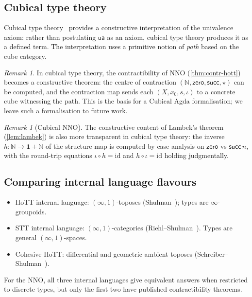 \documentclass[12pt]{article}
\theoremstyle{definition}
\theoremstyle{remark}
\newtheorem{remark}[theorem]{Remark}
\newcommand{\N}{\mathbb{N}}
\newcommand{\id}{\mathrm{id}}
\newcommand{\zero}{\mathsf{zero}}
\newcommand{\suc}{\mathsf{succ}}
\newcommand{\NNO}{\mathrm{NNO}}
\newcommand{\ua}{\mathsf{ua}}
\begin{document}
\subsection{Cubical type theory}

Cubical type theory~\cite{CCHM} provides a constructive interpretation of the univalence axiom: rather than postulating $\ua$ as an axiom, cubical type theory produces it as a defined term. The interpretation uses a primitive notion of \emph{path} based on the cube category.

\begin{remark}
In cubical type theory, the contractibility of $\NNO$ (\cref{thm:contr-hott}) becomes a constructive theorem: the centre of contraction $(\N,\zero,\suc,\star)$ can be computed, and the contraction map sends each $(X,x_{0},s,\iota)$ to a concrete cube witnessing the path. This is the basis for a Cubical Agda formalisation; we leave such a formalisation to future work.
\end{remark}

\begin{remark}[Cubical NNO]
The constructive content of Lambek's theorem (\cref{lem:lambek}) is also more transparent in cubical type theory: the inverse $h\colon \N\to\mathbf{1}+\N$ of the structure map is computed by case analysis on $\zero$ vs $\suc\,n$, with the round-trip equations $\iota\circ h=\id$ and $h\circ\iota=\id$ holding judgmentally.
\end{remark}

\subsection{Comparing internal language flavours}

\begin{itemize}
  \item HoTT internal language: $(\infty,1)$-toposes (Shulman~\cite{Shulman2019}); types are $\infty$-groupoids.
  \item STT internal language: $(\infty,1)$-categories (Riehl--Shulman~\cite{RiehlShulman2017}). Types are general $(\infty,1)$-spaces.
  \item Cohesive HoTT: differential and geometric ambient toposes (Schreiber--Shulman~\cite{SchreiberShulman}).
\end{itemize}

For the NNO, all three internal languages give equivalent answers when restricted to discrete types, but only the first two have published contractibility theorems.
\end{document}
